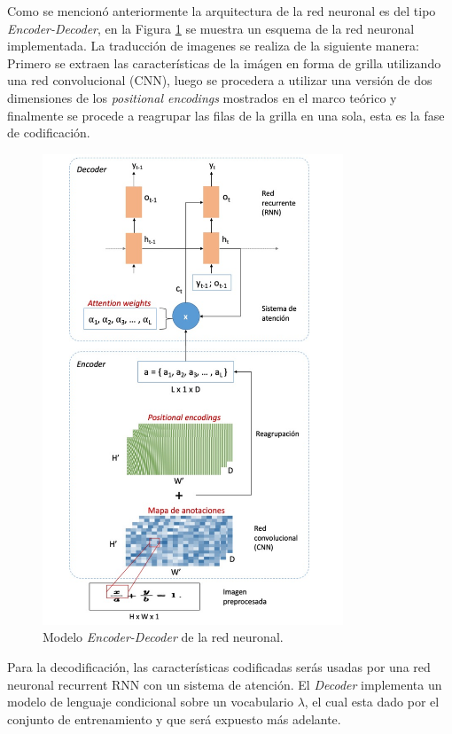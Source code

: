 Como se mencionó anteriormente la arquitectura de la red neuronal es del tipo \textit{Encoder-Decoder}, en la Figura \ref{fig:modelo} se muestra un esquema de la red neuronal implementada. La traducción de imagenes se realiza de la siguiente manera: Primero se extraen las características de la imágen en forma de grilla utilizando una red convolucional (CNN), luego se procedera a utilizar una versión de dos dimensiones de los \textit{positional encodings} mostrados en el marco teórico y finalmente se procede a reagrupar las filas de la grilla en una sola, esta es la fase de codificación. 

\begin{figure}[H]
    \centering
    \includegraphics[width=0.8\textwidth]{capitulo5/modelo/img/modelo}
    \caption{Modelo \textit{Encoder-Decoder} de la red neuronal.}
    \label{fig:modelo}
\end{figure}

Para la decodificación, las características codificadas serás usadas por una red neuronal recurrent RNN con un sistema de atención. El \textit{Decoder} implementa un modelo de lenguaje condicional sobre un vocabulario $\lambda$, el cual esta dado por el conjunto de entrenamiento y que será expuesto más adelante.

